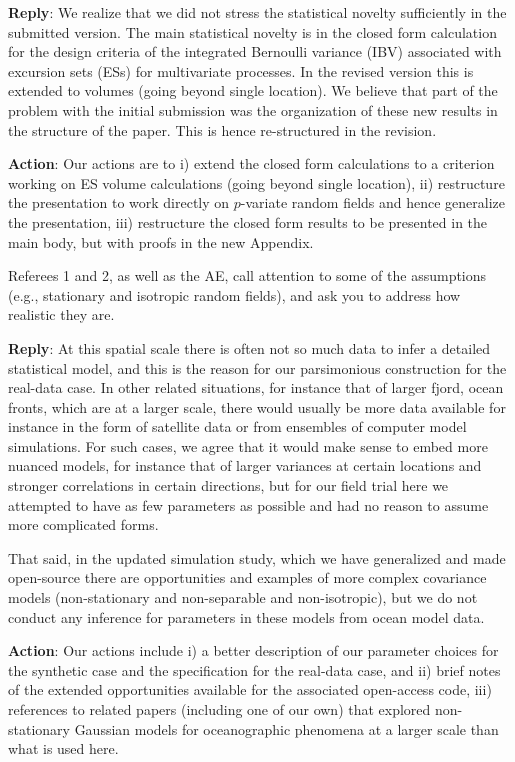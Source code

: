 \documentclass[a4paper]{article}
\def\reply{\textbf{Reply}}
\def\action{\textbf{Action}}
\begin{document}
\reply: We realize that we did not stress the statistical novelty sufficiently in the submitted version. The main statistical novelty is in the closed form calculation for the design criteria of the integrated Bernoulli variance (IBV) associated with excursion sets (ESs) for multivariate processes. In the revised version this is extended to volumes (going beyond single location). We believe that part of the problem with the initial submission was the organization of these new results in the structure of the paper. This is hence re-structured in the revision.

\action: Our actions are to i) extend the closed form calculations to a criterion working on ES volume calculations (going beyond single location), ii) restructure the presentation to work directly on $p$-variate random fields and hence generalize the presentation, iii) restructure the closed form results to be presented in the main body, but with proofs in the new Appendix.

\vspace{5mm}

Referees 1 and 2, as well as the AE, call attention to some of
the assumptions (e.g., stationary and isotropic random fields),
and ask you to address how realistic they are.

\reply: At this spatial scale there is often not so much data to infer a detailed statistical model, and this is the reason for our parsimonious construction for the real-data case. In other related situations, for instance that of larger fjord, ocean fronts, which are at a larger scale, there would usually be more data available for instance in the form of satellite data or from ensembles of computer model simulations. For such cases, we agree that it would make sense to embed more nuanced models, for instance that of larger variances at certain locations and stronger correlations in certain directions, but for our field trial here we attempted to have as few parameters as possible and had no reason to assume more complicated forms. 

That said, in the updated simulation study, which we have generalized and made open-source there are opportunities and examples of more complex covariance models (non-stationary and non-separable and non-isotropic), but we do not conduct any inference for parameters in these models from ocean model data. 

\action: Our actions include i) a better description of our parameter choices for the synthetic case and the specification for the real-data case, and ii) brief notes of the extended opportunities available for the associated open-access code, iii) references to related papers (including one of our own) that explored non-stationary Gaussian models for oceanographic phenomena at a larger scale than what is used here. 
\end{document}
